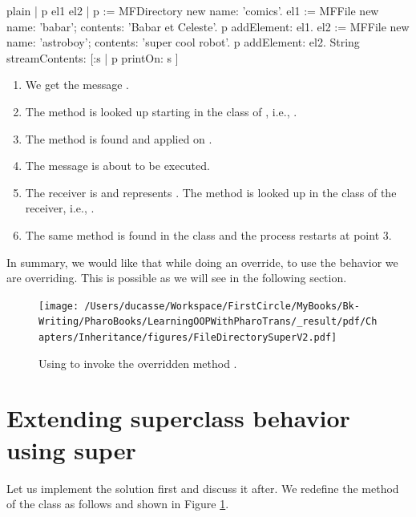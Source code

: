 \documentclass[10pt,twoside,english]{_support/latex/sbabook/sbabook}
\begin{document}
\begin{displaycode}{plain}
| p el1 el2 |
p := MFDirectory new name: 'comics'.
el1 := MFFile new name: 'babar'; contents: 'Babar et Celeste'.
p addElement: el1.
el2 := MFFile new name: 'astroboy'; contents: 'super cool robot'.
p addElement: el2.
String streamContents: [:s | p printOn: s ]
\end{displaycode}

\begin{enumerate}
\item We get the message .
\item The method  is looked up starting in the class of , i.e., .
\item The method is found and applied on .
\item The message   is about to be executed.
\item The receiver is  and represents . The method  is looked up in the class of the receiver,  i.e., .
\item The same method is found in the class  and the process restarts at point 3.
\end{enumerate}

In summary, we would like that while doing an override, to use the behavior we are overriding. This is possible as we will see in the following section. 


\begin{figure}

\begin{center}
\texttt{[image: /Users/ducasse/Workspace/FirstCircle/MyBooks/Bk-Writing/PharoBooks/LearningOOPWithPharoTrans/\_result/pdf/Chapters/Inheritance/figures/FileDirectorySuperV2.pdf]}\caption{Using  to invoke the overridden method .\label{fig:FileDirectorySuperV2}}\end{center}
\end{figure}

\section{Extending superclass behavior using super}
Let us implement the solution first and discuss it after. We redefine the method  of the class  as follows and shown in Figure \ref{fig:FileDirectorySuperV2}.
\end{document}
